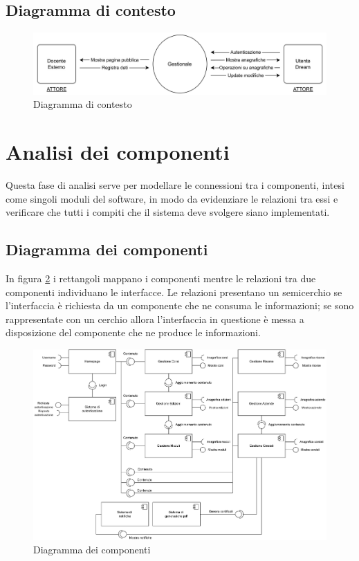 \subsection{Diagramma di contesto}
\begin{figure}[h]
\centering
\includegraphics[scale=0.8]{img/Diagramma di Contesto.jpg}
\caption{Diagramma di contesto}
\label{fig:Diagrammadicontesto}
\end{figure}
\noindent


\section{Analisi dei componenti}
\label{sec:componenti}
Questa fase di analisi serve per modellare le connessioni tra i componenti, intesi come singoli moduli del software, in modo da evidenziare le relazioni tra essi e verificare che tutti i compiti che il sistema deve svolgere siano implementati. 
\subsection{Diagramma dei componenti}
In figura \ref{fig:Diagrammadeicomponenti} i rettangoli mappano i componenti mentre le relazioni tra due componenti individuano le interfacce. Le relazioni presentano un semicerchio se l'interfaccia è richiesta da un componente che ne consuma le informazioni; se sono rappresentate con un cerchio allora l'interfaccia in questione è messa a disposizione del componente che ne produce le informazioni.
\begin{figure}[h]
\centering
\includegraphics[scale=0.55]{img/Diagramma dei componenti.jpg}
\caption{Diagramma dei componenti}
\label{fig:Diagrammadeicomponenti}
\end{figure}
\clearpage
\newpage